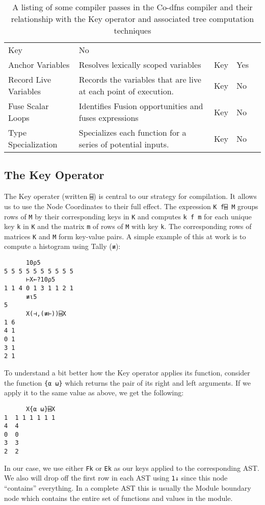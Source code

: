 \documentclass[numbers,preprint]{sigplanconf}
\begin{document}
\begin{table*}
\begin{tabular}{l p{2.8in} l l l}
 Key & No \\
Anchor Variables & Resolves lexically scoped variables &
 Key & Yes \\
Record Live Variables & Records the variables that are live at each point of 
 execution. & Key & No \\
Fuse Scalar Loops & Identifies Fusion opportunities and fuses expressions &
 Key & No \\
Type Specialization & Specializes each function for a series of potential inputs. 
 & Key & No \\
\end{tabular}
\caption{A listing of some compiler passes in the Co-dfns compiler and their 
 relationship with the Key operator and associated tree computation techniques}
\label{tab:passes}
\end{table*}

\subsection{The Key Operator}

The Key operater (written \verb;⌸;) is central to our strategy for compilation.
It allows us to use the Node Coordinates to their full effect. 
The expression \verb;K f⌸ M; groups rows of \verb;M; by their corresponding 
keys in \verb;K; and computes \verb;k f m; for each unique key \verb;k; in 
\verb;K; and the matrix \verb;m; of rows of \verb;M; with key \verb;k;. 
The corresponding rows of matrices \verb;K; and \verb;M; form key-value pairs.
A simple example of this at work is to compute a histogram using Tally (\verb;≢;):

\begin{verbatim}
      10⍴5
5 5 5 5 5 5 5 5 5 5
      ⊢X←?10⍴5
1 1 4 0 1 3 1 1 2 1
      ≢⍳5
5
      X(⊣,(≢⊢))⌸X
1 6
4 1
0 1
3 1
2 1
\end{verbatim}

To understand a bit better how the Key operator applies its function,
consider the function \verb;{⍺ ⍵}; which returns the pair of its right
and left arguments. If we apply it to the same value as above, we
get the following:

\begin{verbatim}
      X{⍺ ⍵}⌸X
1  1 1 1 1 1 1 
4  4           
0  0           
3  3           
2  2
\end{verbatim}

In our case, we use either \verb;Fk; or \verb;Ek; as our keys applied to the
corresponding AST. We also will drop off the first row in each AST
using \verb;1↓; since this node ``contains'' everything. In a complete
AST this is usually the Module boundary node which contains the entire
set of functions and values in the module.
\end{document}
